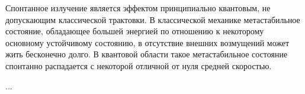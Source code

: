 Спонтанное излучение является эффектом принципиально квантовым, не допускающим 
классической трактовки. В классической механике метастабильное состояние, 
обладающее большей энергией по отношению к некоторому основному устойчивому 
состоянию, в отсутствие внешних возмущений может жить бесконечно долго. В 
квантовой области такое метастабильное состояние спонтанно распадается с 
некоторой отличной от нуля средней скоростью.

...